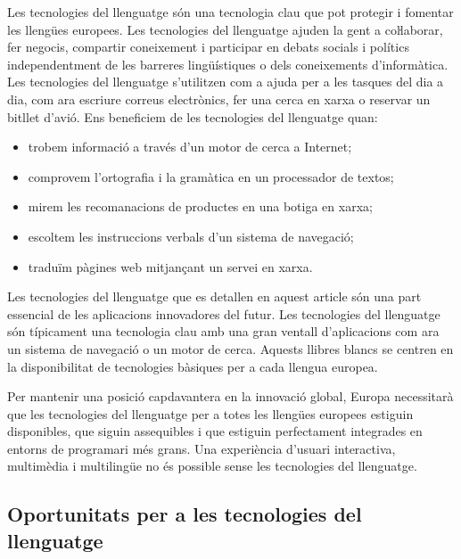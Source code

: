 \begin{multicols}{2}
Les tecnologies del llenguatge són una tecnologia clau que pot protegir i fomentar les llengües europees. Les tecnologies del llenguatge ajuden la gent a coŀlaborar, fer negocis, compartir coneixement i participar en debats socials i polítics independentment de les barreres lingüístiques o dels coneixements d’informàtica. Les tecnologies del llenguatge s’utilitzen com a ajuda per a les tasques del dia a dia, com ara escriure correus electrònics, fer una cerca en xarxa o reservar un bitllet d’avió. Ens beneficiem de les tecnologies del llenguatge quan:   
\begin{itemize}
\item trobem informació a través d’un motor de cerca a Internet;
\item comprovem l’ortografia i la gramàtica en un processador de textos;
\item mirem les recomanacions de productes en una botiga en xarxa;
\item escoltem les instruccions verbals d'un sistema de navegació;
\item traduïm pàgines web mitjançant un servei en xarxa.
\end{itemize}

Les tecnologies del llenguatge que es detallen en aquest article són una part essencial de les aplicacions innovadores del futur. Les tecnologies del llenguatge són típicament una tecnologia clau amb una gran ventall d’aplicacions com ara un sistema de navegació o un motor de cerca. Aquests llibres blancs se centren en la disponibilitat de tecnologies bàsiques per a cada llengua europea.


Per mantenir una posició capdavantera en la innovació global, Europa necessitarà que les tecnologies del llenguatge per a totes les llengües europees estiguin disponibles, que siguin assequibles i que estiguin perfectament integrades en entorns de programari més grans.  Una experiència d’usuari interactiva, multimèdia i multilingüe no és possible sense les tecnologies del llenguatge.

\subsection{Oportunitats per a les tecnologies del llenguatge}


\end{multicols}
